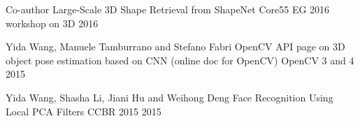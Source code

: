 \begin{cventries}
\cventry
{Co-­author} %
{Large-Scale 3D Shape Retrieval from ShapeNet Core55} %
{EG 2016 workshop on 3D} %
{2016} %
{ %
}


\cventry
{Yida Wang, Manuele Tamburrano and Stefano Fabri} %
{OpenCV API page on 3D object pose estimation based on CNN (online doc for OpenCV)} %
{OpenCV 3 and 4} %
{2015} %
{ %
}

\cventry
{Yida Wang, Shasha Li, Jiani Hu and Weihong Deng} %
{Face Recognition Using Local PCA Filters} %
{CCBR 2015} %
{2015} %
{ %
}


\end{cventries}
